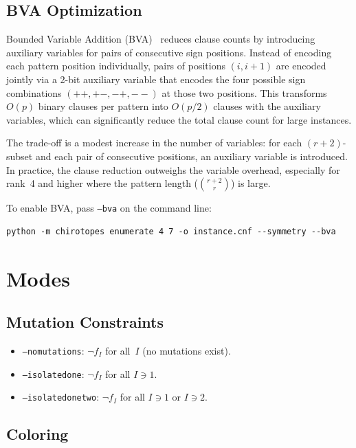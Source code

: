 \documentclass[11pt]{article}
\theoremstyle{definition}
\begin{document}
\subsection{BVA Optimization}

Bounded Variable Addition (BVA)~\cite{SchSch2024} reduces clause counts by introducing auxiliary variables for pairs of consecutive sign positions. Instead of encoding each pattern position individually, pairs of positions $(i, i{+}1)$ are encoded jointly via a 2-bit auxiliary variable that encodes the four possible sign combinations $(+\!+, +\!-, -\!+, -\!-)$ at those two positions. This transforms $O(p)$ binary clauses per pattern into $O(p/2)$ clauses with the auxiliary variables, which can significantly reduce the total clause count for large instances.

The trade-off is a modest increase in the number of variables: for each $(r{+}2)$-subset and each pair of consecutive positions, an auxiliary variable is introduced. In practice, the clause reduction outweighs the variable overhead, especially for rank~4 and higher where the pattern length ($\binom{r+2}{r}$) is large.

To enable BVA, pass \texttt{--bva} on the command line:
\begin{lstlisting}
python -m chirotopes enumerate 4 7 -o instance.cnf --symmetry --bva
\end{lstlisting}

\section{Modes}

\subsection{Mutation Constraints}

\begin{itemize}
\item \texttt{--nomutations}: $\neg f_I$ for all~$I$ (no mutations exist).
\item \texttt{--isolatedone}: $\neg f_I$ for all $I \ni 1$.
\item \texttt{--isolatedonetwo}: $\neg f_I$ for all $I \ni 1$ or $I \ni 2$.
\end{itemize}

\subsection{Coloring}
\end{document}
